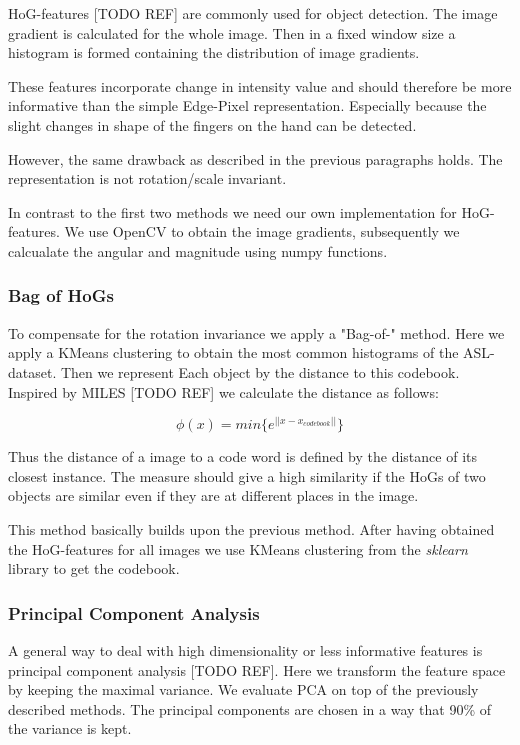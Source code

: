 \documentclass[letterpaper, 10 pt, conference]{ieeeconf}  %
\begin{document}
HoG-features [TODO REF] are commonly used for object detection. The image gradient is calculated for the whole image. Then in a fixed window size a histogram is formed containing the distribution of image gradients.

These features incorporate change in intensity value and should therefore be more informative than the simple Edge-Pixel representation. Especially because the slight changes in shape of the fingers on the hand can be detected.

However, the same drawback as described in the previous paragraphs holds. The representation is not rotation/scale invariant.

In contrast to the first two methods we need our own implementation for HoG-features. We use OpenCV to obtain the image gradients, subsequently we calcualate the angular and magnitude using numpy functions.

\subsubsection{Bag of HoGs}

To compensate for the rotation invariance we apply a "Bag-of-" method. Here we apply a KMeans clustering to obtain the most common histograms of the ASL-dataset. Then we represent Each object by the distance to this codebook. Inspired by MILES [TODO REF] we calculate the distance as follows:

\begin{equation}
	\phi(x) = min\{ e^{||x-x_{codebook}||}\}
\end{equation}

Thus the distance of a image to a code word is defined by the distance of its closest instance. The measure should give a high similarity if the HoGs of two objects are similar even if they are at different places in the image.

This method basically builds upon the previous method. After having obtained the HoG-features for all images we use KMeans clustering from the \textit{sklearn} library to get the codebook.

\subsubsection{Principal Component Analysis}

A general way to deal with high dimensionality or less informative features is principal component analysis [TODO REF]. Here we transform the feature space by keeping the maximal variance. We evaluate PCA on top of the previously described methods. The principal components are chosen in a way that 90\% of the variance is kept.
\end{document}

